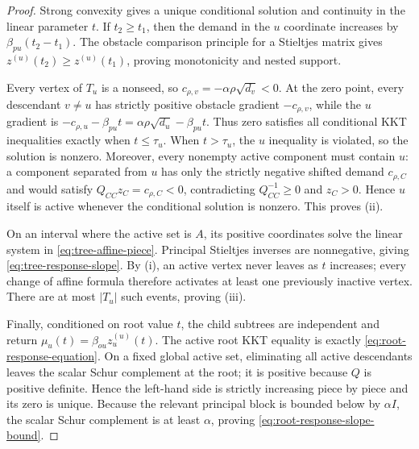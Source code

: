 \begin{proof}
Strong convexity gives a unique conditional solution and continuity in the
linear parameter $t$.  If $t_2\geq t_1$, then the demand in the $u$ coordinate
increases by $\beta_{pu}(t_2-t_1)$.  The obstacle comparison principle for a
Stieltjes matrix gives
$z^{(u)}(t_2)\geq z^{(u)}(t_1)$, proving monotonicity and nested support.

Every vertex of $T_u$ is a nonseed, so
$c_{\rho,v}=-\alpha\rho\sqrt{d_v}<0$.  At the zero point, every descendant
$v\neq u$ has strictly positive obstacle gradient
$-c_{\rho,v}$, while the $u$ gradient is
$-c_{\rho,u}-\beta_{pu}t
=\alpha\rho\sqrt{d_u}-\beta_{pu}t$.
Thus zero satisfies all conditional KKT inequalities exactly when
$t\leq\tau_u$.  When $t>\tau_u$, the $u$ inequality is violated, so the
solution is nonzero.  Moreover, every nonempty active component must contain
$u$: a component separated from $u$ has only the strictly negative shifted
demand $c_{\rho,C}$ and would satisfy
$Q_{CC}z_C=c_{\rho,C}<0$, contradicting
$Q_{CC}^{-1}\geq0$ and $z_C>0$.  Hence $u$ itself is active whenever the
conditional solution is nonzero.  This proves (ii).

On an interval where the active set is $A$, its positive coordinates solve
the linear system in \cref{eq:tree-affine-piece}.  Principal Stieltjes
inverses are nonnegative, giving \cref{eq:tree-response-slope}.  By (i), an
active vertex never leaves as $t$ increases; every change of affine formula
therefore activates at least one previously inactive vertex.  There are at
most $|T_u|$ such events, proving (iii).

Finally, conditioned on root value $t$, the child subtrees are independent
and return $\mu_u(t)=\beta_{ou}z_u^{(u)}(t)$.  The active root KKT equality is
exactly \cref{eq:root-response-equation}.  On a fixed global active set,
eliminating all active descendants leaves the scalar Schur complement at the
root; it is positive because $Q$ is positive definite.  Hence the left-hand
side is strictly increasing piece by piece and its zero is unique.  Because
the relevant principal block is bounded below by $\alpha I$, the scalar Schur
complement is at least $\alpha$, proving
\cref{eq:root-response-slope-bound}.
\end{proof}


